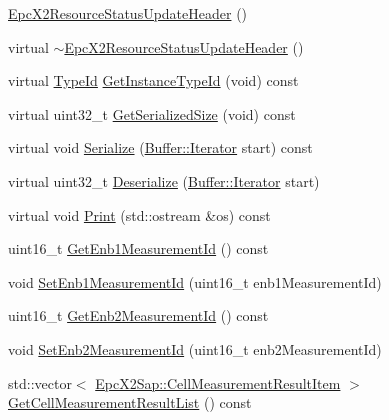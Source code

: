 \begin{DoxyCompactItemize}
\item 
\hyperlink{classns3_1_1EpcX2ResourceStatusUpdateHeader_a2e7cd5220f461abf79c48f1cc7cd3e3e}{Epc\+X2\+Resource\+Status\+Update\+Header} ()
\item 
virtual \hyperlink{classns3_1_1EpcX2ResourceStatusUpdateHeader_a9f63cbc3b62ab0a6b65c27b6fe869ef1}{$\sim$\+Epc\+X2\+Resource\+Status\+Update\+Header} ()
\item 
virtual \hyperlink{classns3_1_1TypeId}{Type\+Id} \hyperlink{classns3_1_1EpcX2ResourceStatusUpdateHeader_a06afb872228d41d50e48dc5bc9476ac8}{Get\+Instance\+Type\+Id} (void) const 
\item 
virtual uint32\+\_\+t \hyperlink{classns3_1_1EpcX2ResourceStatusUpdateHeader_add867fd7cb5ff047578098be34c4d315}{Get\+Serialized\+Size} (void) const 
\item 
virtual void \hyperlink{classns3_1_1EpcX2ResourceStatusUpdateHeader_a30942b4aed0e4ba999297e2cdbc5407c}{Serialize} (\hyperlink{classns3_1_1Buffer_1_1Iterator}{Buffer\+::\+Iterator} start) const 
\item 
virtual uint32\+\_\+t \hyperlink{classns3_1_1EpcX2ResourceStatusUpdateHeader_a170d7fdf963b464d12e7df7a2146ef35}{Deserialize} (\hyperlink{classns3_1_1Buffer_1_1Iterator}{Buffer\+::\+Iterator} start)
\item 
virtual void \hyperlink{classns3_1_1EpcX2ResourceStatusUpdateHeader_a2daf1dc9c900ce60c71c1a1c55e6c270}{Print} (std\+::ostream \&os) const 
\item 
uint16\+\_\+t \hyperlink{classns3_1_1EpcX2ResourceStatusUpdateHeader_a6ed8ae994276dd0fff2a0d86e11cca3d}{Get\+Enb1\+Measurement\+Id} () const 
\item 
void \hyperlink{classns3_1_1EpcX2ResourceStatusUpdateHeader_a49a41e1e2daa8995a5d00813b55fb716}{Set\+Enb1\+Measurement\+Id} (uint16\+\_\+t enb1\+Measurement\+Id)
\item 
uint16\+\_\+t \hyperlink{classns3_1_1EpcX2ResourceStatusUpdateHeader_ad85093ad9db2f50fcf6ce19aa43cdbd7}{Get\+Enb2\+Measurement\+Id} () const 
\item 
void \hyperlink{classns3_1_1EpcX2ResourceStatusUpdateHeader_a355286ac4da6088bf4d1a97482ad25ca}{Set\+Enb2\+Measurement\+Id} (uint16\+\_\+t enb2\+Measurement\+Id)
\item 
std\+::vector$<$ \hyperlink{structns3_1_1EpcX2Sap_1_1CellMeasurementResultItem}{Epc\+X2\+Sap\+::\+Cell\+Measurement\+Result\+Item} $>$ \hyperlink{classns3_1_1EpcX2ResourceStatusUpdateHeader_a3d25e7e7e3e097aabddfb874dc741834}{Get\+Cell\+Measurement\+Result\+List} () const 

\end{DoxyCompactItemize}
